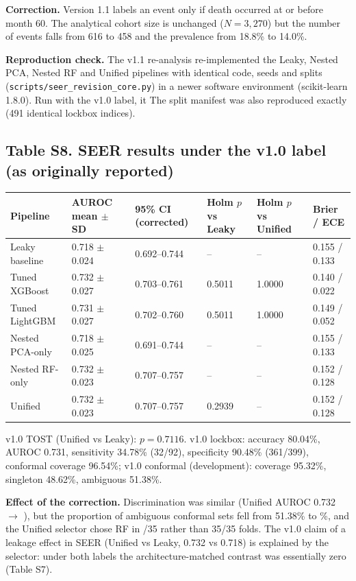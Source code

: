 \documentclass[10pt,a4paper]{article}
\begin{document}
\textbf{Correction.} Version 1.1 labels an event only if death occurred at or before month 60. The analytical cohort size is unchanged ($N=3{,}270$) but the number of events falls from 616 to 458 and the prevalence from 18.8\% to 14.0\%.

\textbf{Reproduction check.} The v1.1 re-analysis re-implemented the Leaky, Nested PCA, Nested RF and Unified pipelines with identical code, seeds and splits (\texttt{scripts/seer\_revision\_core.py}) in a newer software environment (scikit-learn 1.8.0). Run with the v1.0 label, it \seerReproText{} The split manifest was also reproduced exactly (491 identical lockbox indices).

\subsection*{Table S8. SEER results under the v1.0 label (as originally reported)}
{\small
\begin{tabularx}{\textwidth}{@{}lYYYYY@{}}
\toprule
\textbf{Pipeline} & \textbf{AUROC mean $\pm$ SD} & \textbf{95\% CI (corrected)} & \textbf{Holm $p$ vs Leaky} & \textbf{Holm $p$ vs Unified} & \textbf{Brier / ECE}\\
\midrule
Leaky baseline & 0.718 $\pm$ 0.024 & 0.692--0.744 & -- & -- & 0.155 / 0.133\\
Tuned XGBoost & 0.732 $\pm$ 0.027 & 0.703--0.761 & 0.5011 & 1.0000 & 0.140 / 0.022\\
Tuned LightGBM & 0.731 $\pm$ 0.027 & 0.702--0.760 & 0.5011 & 1.0000 & 0.149 / 0.052\\
Nested PCA-only & 0.718 $\pm$ 0.025 & 0.691--0.744 & -- & -- & 0.155 / 0.133\\
Nested RF-only & 0.732 $\pm$ 0.023 & 0.707--0.757 & -- & -- & 0.152 / 0.128\\
Unified & 0.732 $\pm$ 0.023 & 0.707--0.757 & 0.2939 & -- & 0.152 / 0.128\\
\bottomrule
\end{tabularx}
}
v1.0 TOST (Unified vs Leaky): $p=0.7116$. v1.0 lockbox: accuracy 80.04\%, AUROC 0.731, sensitivity 34.78\% (32/92), specificity 90.48\% (361/399), conformal coverage 96.54\%; v1.0 conformal (development): coverage 95.32\%, singleton 48.62\%, ambiguous 51.38\%.

\textbf{Effect of the correction.} Discrimination was similar (Unified AUROC 0.732 $\rightarrow$ \seerUniAUC), but the proportion of ambiguous conformal sets fell from 51.38\% to \seerConfAmb\%, and the Unified selector chose RF in \seerRFfolds/35 rather than 35/35 folds. The v1.0 claim of a leakage effect in SEER (Unified vs Leaky, 0.732 vs 0.718) is explained by the selector: under both labels the architecture-matched contrast was essentially zero (Table S7).
\end{document}
